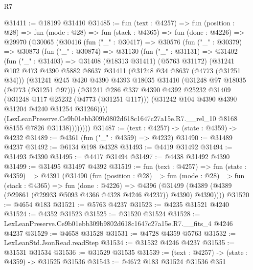 \begin{lexlean}{R7}
\begin{coremodule}
@31411 := @18199 @31410
@31485 := fun (text : @4257) =>
  fun (position : @28) =>
  fun (mode : @28) =>
  fun (stack : @4365) =>
  fun (done : @4226) =>
  @29970
    (@30065
      (@30416
        (fun ("_" : @30417) =>
        @30576
          (fun ("_" : @30379) =>
          @30873
            (fun ("_" : @30874) =>
            @31130
              (fun ("_" : @31131) =>
              @31402
                (fun ("_" : @31403) =>
                @31408
                  (@18313 @31411)
                  (@5763 @31172)
                  (@31241
                    @102
                    @473
                    @4390
                    @5882
                    @8637
                    @31411
                    (@31248 @34 @8637 (@4773 (@31251 @34)))
                    (@31241
                      @245
                      @420
                      @4390
                      @4393
                      @18035
                      @31410
                      (@31248 @97 @18035 (@4773 (@31251 @97)))
                      (@31241
                        @286
                        @337
                        @4390
                        @4392
                        @25232
                        @31409
                        (@31248 @117 @25232 (@4773 (@31251 @117)))
                        (@31242 @104 @4390 @4390 @31204 @4240 @31254 @31266))))
                  (LexLeanPreserve.Ce9b01ebb309b9802d618c1647c27a15e.R7.__rel_10
                    @8168
                    @8155
                    @7826
                    @31138))))))))
@31487 := (text : @4257) -> (state : @4359) -> @4232
@31489 := @4361 (fun ("_" : @4359) => @4232)
@31490 := @31489 @4237
@31492 := @6134 @198 @4328
@31493 := @4419 @31492
@31494 := @31493 @4390
@31495 := @4417 @31494
@31497 := @4438 @31492 @4390
@31499 := @31495 @31497 @4392
@31519 := fun (text : @4257) =>
  fun (state : @4359) =>
  @4391
    (@31490
      (fun (position : @28) =>
      fun (mode : @28) =>
      fun (stack : @4365) =>
      fun (done : @4226) =>
      @4396 (@31499 (@4389 (@4389 (@29861 (@29933 @5093 @4366 @4328 @4246 @4237)) @4390) @4390))))
@31520 := @4654 @183
@31521 := @5763 @4237
@31523 := @4235 @31521 @4240
@31524 := @4352 @31523
@31525 := @31520 @31524
@31528 := LexLeanPreserve.Ce9b01ebb309b9802d618c1647c27a15e.R7.__fits_4 @4246 @4237
@31529 := @4658 @31528
@31531 := @4728 @4359 @5763
@31532 := LexLeanStd.JsonRead.readStep
@31534 := @31532 @4246 @4237
@31535 := @31531 @31534
@31536 := @31529 @31535
@31539 := (text : @4257) -> (state : @4359) -> @31525 @31536
@31543 := @4672 @183 @31524 @31536 @351

\end{coremodule}
\end{lexlean}
